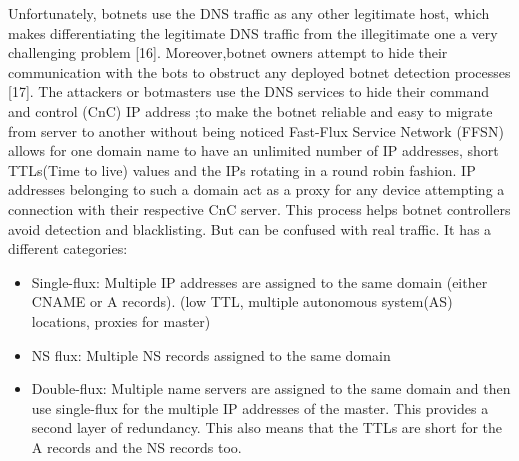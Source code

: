 Unfortunately, botnets use the DNS traffic as any other legitimate host, which makes differentiating the legitimate DNS traffic from the illegitimate one a very challenging problem [16]. Moreover,botnet owners attempt to hide their communication with the bots to obstruct any deployed botnet detection processes [17]. The attackers or botmasters use the DNS services to hide their command and control (CnC) IP address ;to make the botnet reliable and easy to migrate from server to another without being noticed
Fast-Flux Service Network (FFSN) allows for one domain name to have an unlimited number of IP addresses, short TTLs(Time to live) values and the IPs rotating in a round robin fashion. IP addresses belonging to such a domain act as a proxy for any device attempting a connection with their respective
CnC server. This process helps botnet controllers avoid detection and blacklisting. But can be confused with real traffic. It has a different categories:
\begin{itemize}[noitemsep]
\item Single-flux: Multiple IP addresses are assigned to the same domain (either CNAME or A records). (low TTL, multiple autonomous system(AS) locations, proxies for master)
\item NS flux: Multiple NS records assigned to the same domain
\item Double-flux: Multiple name servers are assigned to the same domain and then use single-flux for the multiple IP addresses of the master. This provides a second layer of redundancy. This also means that the TTLs are short for the A records and the NS records too.
\end{itemize}

